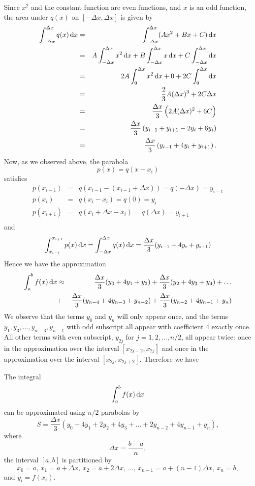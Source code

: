\documentclass[reqno, 12pt]{amsart}
\begin{document}
Since \(x^2\) and the constant function are even functions, and \(x\) is an odd function, the area under \(q(x)\) on \([-\Delta x, \Delta x]\) is given by
\begin{eqnarray*}
  \int_{-\Delta x}^{\Delta x} q(x) \dif x &=& \int_{-\Delta x}^{\Delta x}(Ax^2 + Bx + C)\dif x\\
  &=& A\int_{-\Delta x}^{\Delta x} x^2 \dif x + B \int_{-\Delta x}^{\Delta x} x \dif x + C \int_{-\Delta x}^{\Delta x} \dif x\\
  &=& 2A \int_0^{\Delta x} x^2 \dif x + 0 + 2C \int_0^{\Delta x} \dif x\\
  &=& \frac{2}{3}A(\Delta x)^3 + 2C\Delta x\\
  &=& \frac{\Delta x}{3}\left(2A(\Delta x)^2 + 6C\right)\\
  &=& \frac{\Delta x}{3}\left(y_{i-1} + y_{i + 1} - 2y_i + 6y_i\right)\\
  &=& \frac{\Delta x}{3}\left(y_{i - 1} + 4y_i + y_{i + 1}\right).
\end{eqnarray*}
Now, as we observed above, the parabola
\[p(x) = q(x - x_i)\]
satisfies
\begin{eqnarray*}
  p(x_{i-1}) &=& q(x_{i - 1} - (x_{i-1} + \Delta x)) = q(-\Delta x) = y_{i-1}\\
  p(x_{i}) &=& q(x_{i} - x_{i}) = q(0) = y_{i}\\
  p(x_{i+1}) &=& q(x_i + \Delta x - x_i) = q(\Delta x) = y_{i+1}\\
\end{eqnarray*}
and
\[\int_{x_{i-1}}^{x_{i+1}} p(x)\dif x =
\int_{-\Delta x}^{\Delta x} q(x)\dif x =
\frac{\Delta x}{3}(y_{i - 1} + 4y_i + y_{i + 1})\]
Hence we have the approximation
\begin{eqnarray*}
  \int_a^b f(x)\dif x &\approx& \frac{\Delta x}{3}(y_0 + 4y_1 + y_2) +
  \frac{\Delta x}{3}(y_2 + 4y_3 + y_4) + \ldots \\
  &+& \frac{\Delta x}{3}(y_{n - 4} + 4y_{n - 3} + y_{n - 2}) + 
  \frac{\Delta x}{3}(y_{n-2} + 4y_{n-1} + y_n)\\
\end{eqnarray*}
We observe that the terms \(y_0\) and \(y_n\) will only appear once, and the terms \(y_1, y_3, \ldots, y_{n - 3}, y_{n-1}\) with odd subscript all appear with coefficient 4 exactly once.
All other terms with even subscript, \(y_{2j}\) for \(j = 1, 2, \ldots, n/2\), all appear twice: once in the approximation over the interval \([x_{2j-2}, x_{2j}]\) and once in the approximation over the interval \([x_{2j}, x_{2j + 2}]\).
Therefore we have
\begin{theorem}
  The integral
  \[\int_a^b f(x)\dif x\]
  can be approximated using \(n/2\) parabolas by
  \[S = \frac{\Delta x}{3}\left(y_0 + 4y_1 + 2y_2 + 4y_3 + \ldots + 2y_{n - 2}+ 4y_{n-1} + y_n\right),\]
  where
  \[\Delta x = \frac{b - a}{n},\]
  the interval \([a,b]\) is partitioned by
  \[x_0 = a,\, x_1 = a + \Delta x,\, x_2 = a + 2\Delta x,\, \ldots,\, x_{n-1} = a + (n-1)\Delta x,\, x_n = b,\]
  and \(y_i = f(x_i)\).
\end{theorem}
\end{document}
